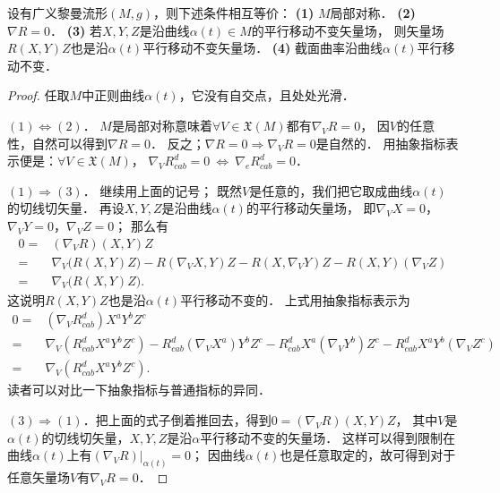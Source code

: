 \begin{theorem}\label{chhss:thm_local-symmetry}
    设有广义黎曼流形$(M,g)$，则下述条件相互等价：    
    {\bfseries (1)} $M$局部对称．    
    {\bfseries (2)} $\nabla R=0$．    
    {\bfseries (3)} 若$X,Y,Z$是沿曲线$\alpha(t)\in M$的平行移动不变矢量场，
    则矢量场$R(X,Y)Z$也是沿$\alpha(t)$平行移动不变矢量场．    
    {\bfseries (4)} 截面曲率沿曲线$\alpha(t)$平行移动不变．
\end{theorem}
\begin{proof}
    任取$M$中正则曲线$\alpha(t)$，它没有自交点，且处处光滑．
    
    $(1)\Leftrightarrow (2)$． $M$是局部对称意味着$\forall V \in \mathfrak{X}(M)$都有$\nabla_V R =0$，
    因$V$的任意性，自然可以得到$\nabla R = 0$．
    反之；$\nabla R = 0 \Rightarrow \nabla_V R=0$是自然的．
    用抽象指标表示便是：$\forall V \in \mathfrak{X}(M)$，
    $\nabla_V R^d_{cab}=0 \ \Leftrightarrow \ \nabla_e R^d_{cab} =0 $．
    
    $(1)\Rightarrow (3)$． 继续用上面的记号；
    既然$V$是任意的，我们把它取成曲线$\alpha(t)$的切线切矢量．
    再设$X,Y,Z$是沿曲线$\alpha(t)$的平行移动矢量场，
    即$\nabla_V X=0$，$\nabla_V Y=0$，$\nabla_V Z=0$；    那么有
    \begin{align*}
        0=&(\nabla_V R)(X, Y) Z \\
        =& \nabla_V\bigl(R(X, Y) Z\bigr)  - R(\nabla_V X, Y) Z - R (X, \nabla_V Y)  Z
        - R (X, Y) (\nabla_V Z)   \\
        =&\nabla_V\bigl(R(X, Y) Z\bigr) .
    \end{align*}
    这说明$R(X,Y)Z$也是沿$\alpha(t)$平行移动不变的．
    上式用抽象指标表示为
    \begin{align*}
        0=&(\nabla_V R^d_{cab})X^a Y^b Z^c \\
        =& \nabla_V(R^d_{cab}X^a Y^b Z^c) 
         - R^d_{cab} (\nabla_V X^a) Y^b Z^c - R^d_{cab} X^a (\nabla_V Y^b)  Z^c
         - R^d_{cab} X^a Y^b (\nabla_V Z^c)   \\
        =&\nabla_V(R^d_{cab}X^a Y^b Z^c) .
    \end{align*}
    读者可以对比一下抽象指标与普通指标的异同．
    
    $(3) \Rightarrow (1)$．把上面的式子倒着推回去，得到$0=(\nabla_V R)(X, Y) Z$，
    其中$V$是$\alpha(t)$的切线切矢量，$X,Y,Z$是沿$\alpha$平行移动不变的矢量场．
    这样可以得到限制在曲线$\alpha(t)$上有$(\nabla_V R)|_{\alpha(t)}=0$；
    因曲线$\alpha(t)$也是任意取定的，故可得到对于任意矢量场$V$有$\nabla_V R=0$．
    

\end{proof}
